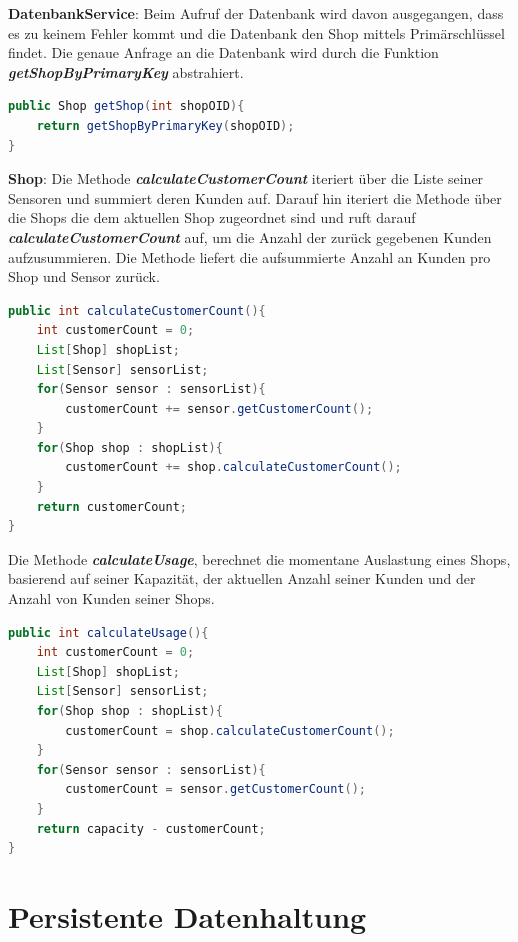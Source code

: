 \documentclass[runningheads]{llncs}
\begin{document}
\textbf{DatenbankService}: Beim Aufruf der Datenbank wird davon ausgegangen, dass es zu keinem Fehler kommt und die Datenbank den Shop mittels Primärschlüssel findet.
Die genaue Anfrage an die Datenbank wird durch die Funktion \textbf{\textit{getShopByPrimaryKey}} abstrahiert.
\begin{lstlisting}[language=Java, basicstyle=\scriptsize]
public Shop getShop(int shopOID){
	return getShopByPrimaryKey(shopOID);
}
\end{lstlisting}

\break
\textbf{Shop}: Die Methode \textbf{\textit{calculateCustomerCount}} iteriert über die Liste seiner Sensoren und summiert deren Kunden auf.
Darauf hin iteriert die Methode über die Shops die dem aktuellen Shop zugeordnet sind und ruft darauf \textbf{\textit{calculateCustomerCount}} auf, um die Anzahl der zurück gegebenen Kunden aufzusummieren.
Die Methode liefert die aufsummierte Anzahl an Kunden pro Shop und Sensor zurück.
\begin{lstlisting}[language=Java, basicstyle=\scriptsize]
public int calculateCustomerCount(){
	int customerCount = 0;
	List[Shop] shopList;
	List[Sensor] sensorList;
	for(Sensor sensor : sensorList){
		customerCount += sensor.getCustomerCount();
	}
	for(Shop shop : shopList){
		customerCount += shop.calculateCustomerCount();
	}
	return customerCount;
}
\end{lstlisting}

Die Methode \textbf{\textit{calculateUsage}}, berechnet die momentane Auslastung eines Shops, basierend auf seiner Kapazität, der aktuellen Anzahl seiner Kunden und der Anzahl von Kunden seiner Shops.
\begin{lstlisting}[language=Java, basicstyle=\scriptsize]
public int calculateUsage(){
	int customerCount = 0;
	List[Shop] shopList;
	List[Sensor] sensorList;
	for(Shop shop : shopList){
		customerCount = shop.calculateCustomerCount();
	}
	for(Sensor sensor : sensorList){
		customerCount = sensor.getCustomerCount();
	}
	return capacity - customerCount;
}
\end{lstlisting}

\newpage
\section{Persistente Datenhaltung}
\end{document}

